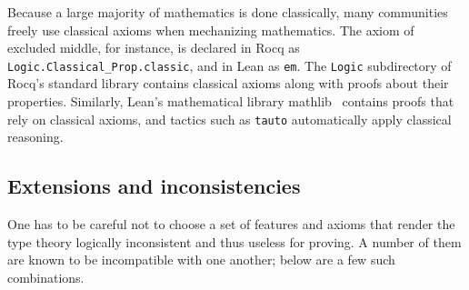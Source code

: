 \documentclass{article}
\newcommand{\code}[1]{\texttt{#1}}
\begin{document}
Because a large majority of mathematics is done classically,
many communities freely use classical axioms when mechanizing mathematics.
The axiom of excluded middle, for instance,
is declared in Rocq as \code{Logic.Classical\_Prop.classic},
and in Lean as \code{em}.
The \code{Logic} subdirectory of Rocq's standard library
contains classical axioms along with proofs about their properties.
Similarly, Lean's mathematical library mathlib~\citep{mathlib}
contains proofs that rely on classical axioms,
and tactics such as \code{tauto} automatically apply classical reasoning.

\subsection{Extensions and inconsistencies}

One has to be careful not to choose a set of features and axioms
that render the type theory logically inconsistent and thus useless for proving.
A number of them are known to be incompatible with one another;
below are a few such combinations.
\end{document}
